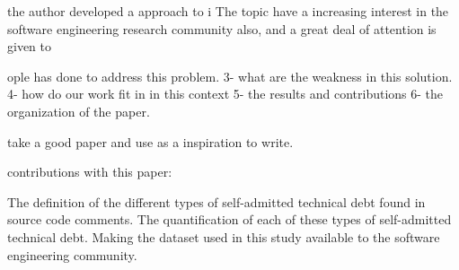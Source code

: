  the author developed a approach to i 
The topic have a increasing interest in the software engineering research community also, and a great deal of attention is given to    


ople has done to address this problem. 
3- what are the weakness in this solution. 
4- how do our work fit in in this context
5- the results and contributions 
6- the organization of the paper. 

take a good paper and use as a inspiration to write. 


contributions with this paper:

The definition of the different types of self-admitted technical debt found in source code comments.
The quantification of each of these types of self-admitted technical debt.
Making the dataset used in this study available to the software engineering community.  